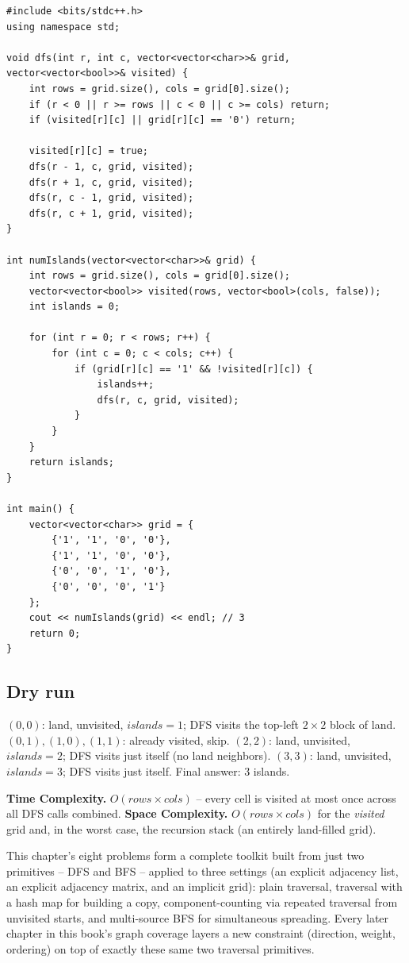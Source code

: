 \begin{lstlisting}
#include <bits/stdc++.h>
using namespace std;

void dfs(int r, int c, vector<vector<char>>& grid, vector<vector<bool>>& visited) {
    int rows = grid.size(), cols = grid[0].size();
    if (r < 0 || r >= rows || c < 0 || c >= cols) return;
    if (visited[r][c] || grid[r][c] == '0') return;

    visited[r][c] = true;
    dfs(r - 1, c, grid, visited);
    dfs(r + 1, c, grid, visited);
    dfs(r, c - 1, grid, visited);
    dfs(r, c + 1, grid, visited);
}

int numIslands(vector<vector<char>>& grid) {
    int rows = grid.size(), cols = grid[0].size();
    vector<vector<bool>> visited(rows, vector<bool>(cols, false));
    int islands = 0;

    for (int r = 0; r < rows; r++) {
        for (int c = 0; c < cols; c++) {
            if (grid[r][c] == '1' && !visited[r][c]) {
                islands++;
                dfs(r, c, grid, visited);
            }
        }
    }
    return islands;
}

int main() {
    vector<vector<char>> grid = {
        {'1', '1', '0', '0'},
        {'1', '1', '0', '0'},
        {'0', '0', '1', '0'},
        {'0', '0', '0', '1'}
    };
    cout << numIslands(grid) << endl; // 3
    return 0;
}
\end{lstlisting}

\subsection*{Dry run}


$(0,0)$: land, unvisited, $\textit{islands}=1$; DFS visits the
top-left $2\times2$ block of land. $(0,1),(1,0),(1,1)$: already
visited, skip. $(2,2)$: land, unvisited, $\textit{islands}=2$; DFS
visits just itself (no land neighbors). $(3,3)$: land, unvisited,
$\textit{islands}=3$; DFS visits just itself. Final answer: $3$
islands.

\begin{complexitybox}
\textbf{Time Complexity.} $O(\textit{rows} \times \textit{cols})$ --
every cell is visited at most once across all DFS calls combined.
\textbf{Space Complexity.} $O(\textit{rows} \times \textit{cols})$ for
the \textit{visited} grid and, in the worst case, the recursion stack
(an entirely land-filled grid).
\end{complexitybox}

\begin{takeawaybox}
This chapter's eight problems form a complete toolkit built from just
two primitives -- DFS and BFS -- applied to three settings (an explicit
adjacency list, an explicit adjacency matrix, and an implicit grid):
plain traversal, traversal with a hash map for building a copy,
component-counting via repeated traversal from unvisited starts, and
multi-source BFS for simultaneous spreading. Every later chapter in
this book's graph coverage layers a new constraint (direction, weight,
ordering) on top of exactly these same two traversal primitives.
\end{takeawaybox}
